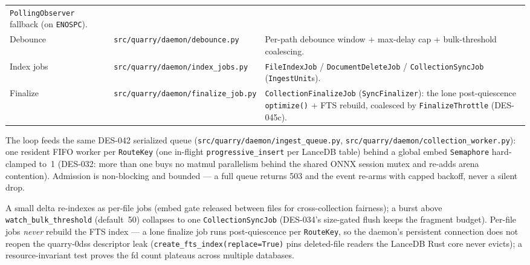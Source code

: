 \documentclass[a4paper,10pt]{article}
\newcommand{\modpath}[1]{\texttt{src/quarry/#1}}
\begin{document}
\begin{center}
\begin{tabular}{llp{6.6cm}}
              \texttt{PollingObserver} fallback (on \texttt{ENOSPC}). \\
Debounce    & \modpath{daemon/debounce.py}      & Per-path debounce window +
              max-delay cap + bulk-threshold coalescing. \\
Index jobs  & \modpath{daemon/index\_jobs.py}   & \texttt{FileIndexJob} /
              \texttt{DocumentDeleteJob} / \texttt{CollectionSyncJob}
              (\texttt{IngestUnit}s). \\
Finalize    & \modpath{daemon/finalize\_job.py} & \texttt{CollectionFinalizeJob}
              (\texttt{SyncFinalizer}): the lone post-quiescence
              \texttt{optimize()} + FTS rebuild, coalesced by
              \texttt{FinalizeThrottle} (DES-045c). \\
\bottomrule
\end{tabular}
\end{center}

The loop feeds the same DES-042 serialized queue (\modpath{daemon/ingest\_queue.py},
\modpath{daemon/collection\_worker.py}): one resident FIFO worker per
\texttt{RouteKey} (one in-flight \texttt{progressive\_insert} per LanceDB
table) behind a global embed \texttt{Semaphore} hard-clamped to~1 (DES-032:
more than one buys no matmul parallelism behind the shared ONNX session mutex
and re-adds arena contention).  Admission is non-blocking and bounded --- a
full queue returns 503 and the event re-arms with capped backoff, never a
silent drop.

A small delta re-indexes as per-file jobs (embed gate released between files
for cross-collection fairness); a burst above \texttt{watch\_bulk\_threshold}
(default~50) collapses to one \texttt{CollectionSyncJob} (DES-034's size-gated
flush keeps the fragment budget).  Per-file jobs \emph{never} rebuild the FTS
index --- a lone finalize job runs post-quiescence per \texttt{RouteKey}, so
the daemon's persistent connection does not reopen the quarry-0dss descriptor
leak (\texttt{create\_fts\_index(replace=True)} pins deleted-file readers the
LanceDB Rust core never evicts); a resource-invariant test proves the fd count
plateaus across multiple databases.
\end{document}
